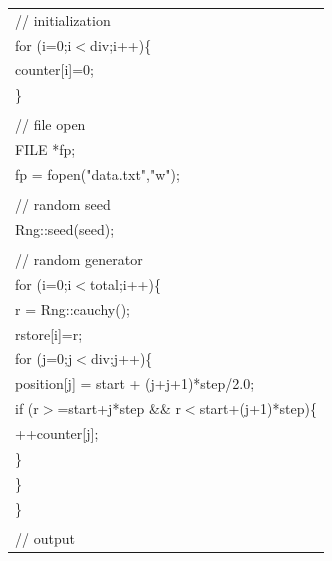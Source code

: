 {\footnotesize
\begin{center}
\begin{tabular}{|l|}\hline
\hspace*{10mm}// initialization\\
\hspace*{10mm}for (i=0;i$<$div;i++)\{\\
\hspace*{20mm}counter[i]=0;\\
\hspace*{10mm}\}\\
\\
\hspace*{10mm}// file open\\
\hspace*{10mm}FILE *fp;\\
\hspace*{10mm}fp = fopen("data.txt","w");\\
\\
\hspace*{10mm}// random seed\\
\hspace*{10mm}Rng::seed(seed);\\
\\
\hspace*{10mm}// random generator\\
\hspace*{10mm}for (i=0;i$<$total;i++)\{\\
\hspace*{20mm}r = Rng::cauchy();\\
\hspace*{20mm}rstore[i]=r;\\
\hspace*{20mm}for (j=0;j$<$div;j++)\{\\
\hspace*{30mm}position[j] = start + (j+j+1)*step/2.0;\\
\hspace*{30mm}if (r$>$=start+j*step \&\& r$<$start+(j+1)*step)\{\\
\hspace*{40mm}++counter[j];\\
\hspace*{30mm}\}\\
\hspace*{20mm}\}\\
\hspace*{10mm}\}\\
\\
\hspace*{10mm}// output\\

\end{tabular}
\end{center}}
